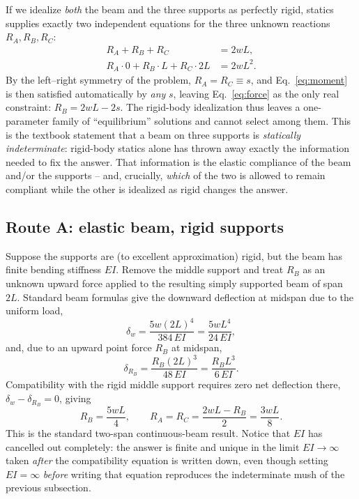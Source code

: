 \documentclass[11pt]{article}
\begin{document}
If we idealize \emph{both} the beam and the three supports as perfectly rigid, statics supplies exactly two independent equations for the three unknown reactions $R_A,R_B,R_C$:
\begin{align}
R_A+R_B+R_C &= 2wL, \label{eq:force}\\
R_A\cdot 0 + R_B\cdot L + R_C\cdot 2L &= 2wL^2. \label{eq:moment}
\end{align}
By the left--right symmetry of the problem, $R_A=R_C\equiv s$, and Eq.~\eqref{eq:moment} is then satisfied automatically by \emph{any} $s$, leaving Eq.~\eqref{eq:force} as the only real constraint: $R_B = 2wL-2s$. The rigid-body idealization thus leaves a one-parameter family of ``equilibrium'' solutions and cannot select among them. This is the textbook statement that a beam on three supports is \emph{statically indeterminate}: rigid-body statics alone has thrown away exactly the information needed to fix the answer. That information is the elastic compliance of the beam and/or the supports -- and, crucially, \emph{which} of the two is allowed to remain compliant while the other is idealized as rigid changes the answer.

\subsection{Route A: elastic beam, rigid supports}

Suppose the supports are (to excellent approximation) rigid, but the beam has finite bending stiffness $EI$. Remove the middle support and treat $R_B$ as an unknown upward force applied to the resulting simply supported beam of span $2L$. Standard beam formulas give the downward deflection at midspan due to the uniform load,
\begin{equation}
\delta_w = \frac{5w(2L)^4}{384\,EI} = \frac{5wL^4}{24\,EI},
\end{equation}
and, due to an upward point force $R_B$ at midspan,
\begin{equation}
\delta_{R_B} = \frac{R_B(2L)^3}{48\,EI} = \frac{R_B L^3}{6\,EI}.
\end{equation}
Compatibility with the rigid middle support requires zero net deflection there, $\delta_w-\delta_{R_B}=0$, giving
\begin{equation}
R_B = \frac{5wL}{4}, \qquad R_A=R_C = \frac{2wL-R_B}{2} = \frac{3wL}{8}.
\label{eq:routeA}
\end{equation}
This is the standard two-span continuous-beam result. Notice that $EI$ has cancelled out completely: the answer is finite and unique in the limit $EI\to\infty$ taken \emph{after} the compatibility equation is written down, even though setting $EI=\infty$ \emph{before} writing that equation reproduces the indeterminate mush of the previous subsection.
\end{document}
